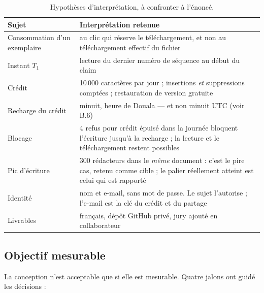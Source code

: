 \begin{table}[H]
\centering
\small
\begin{tabular}{@{}p{5.4cm}p{10.2cm}@{}}
\toprule
\textbf{Sujet} & \textbf{Interprétation retenue} \\
\midrule
Consommation d'un exemplaire & au clic qui réserve le téléchargement, et non au
  téléchargement effectif du fichier \\
\addlinespace
Instant $T_1$ & lecture du dernier numéro de séquence au début du claim \\
\addlinespace
Crédit & 10\,000 caractères par jour ; insertions \emph{et} suppressions
  comptées ; restauration de version gratuite \\
\addlinespace
Recharge du crédit & minuit, heure de Douala — et non minuit UTC (voir B.6) \\
\addlinespace
Blocage & 4 refus pour crédit épuisé dans la journée bloquent l'écriture
  jusqu'à la recharge ; la lecture et le téléchargement restent possibles \\
\addlinespace
Pic d'écriture & 300 rédacteurs dans le \emph{même} document : c'est le pire cas,
  retenu comme cible ; le palier réellement atteint est celui qui est rapporté \\
\addlinespace
Identité & nom et e-mail, sans mot de passe. Le sujet l'autorise ; l'e-mail est
  la clé du crédit et du partage \\
\addlinespace
Livrables & français, dépôt GitHub privé, jury ajouté en collaborateur \\
\bottomrule
\end{tabular}
\caption{Hypothèses d'interprétation, à confronter à l'énoncé.}
\label{tab:hypotheses}
\end{table}


\subsection{Objectif mesurable}

La conception n'est acceptable que si elle est mesurable. Quatre jalons ont
guidé les décisions :

